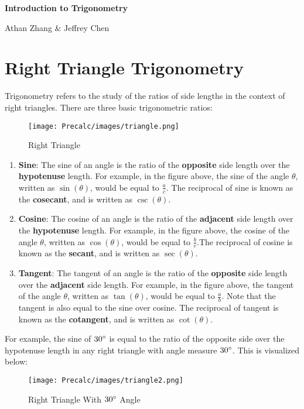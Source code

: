 \documentclass[11pt]{article}
\begin{document}
\textbf{\Huge Introduction to Trigonometry}

Athan Zhang \& Jeffrey Chen

\section{Right Triangle Trigonometry}
Trigonometry refers to the study of the ratios of side lengths in the context of right triangles. There are three basic trigonometric ratios:

\begin{figure}[H]
    \centering
    \texttt{[image: Precalc/images/triangle.png]}
    \caption{Right Triangle}
    \label{fig:triangle}
\end{figure}

\begin{enumerate}
    \item \textbf{Sine}: The sine of an angle is the ratio of the \textbf{opposite} side length over the \textbf{hypotenuse} length. For example, in the figure above, the sine of the angle $\theta$, written as $\sin(\theta)$, would be equal to $\frac{a}{c}$. The reciprocal of sine is known as the \textbf{cosecant}, and is written as $\csc(\theta)$.
    \item \textbf{Cosine}: The cosine of an angle is the ratio of the \textbf{adjacent} side length over the \textbf{hypotenuse} length. For example, in the figure above, the cosine of the angle $\theta$, written as $\cos(\theta)$, would be equal to $\frac{b}{c}$.The reciprocal of cosine is known as the \textbf{secant}, and is written as $\sec(\theta)$.
    \item \textbf{Tangent}: The tangent of an angle is the ratio of the \textbf{opposite} side length over the \textbf{adjacent} side length. For example, in the figure above, the tangent of the angle $\theta$, written as $\tan(\theta)$, would be equal to $\frac{a}{b}$. Note that the tangent is also equal to the sine over cosine. The reciprocal of tangent is known as the \textbf{cotangent}, and is written as $\cot(\theta)$.
\end{enumerate}

For example, the sine of $30\degree$ is equal to the ratio of the opposite side over the hypotenuse length in any right triangle with angle measure $30\degree$. This is visualized below:

\begin{figure}[H]
    \centering
    \texttt{[image: Precalc/images/triangle2.png]}
    \caption{Right Triangle With $30\degree$ Angle}
    \label{fig:triangle2}
\end{figure}
\end{document}
